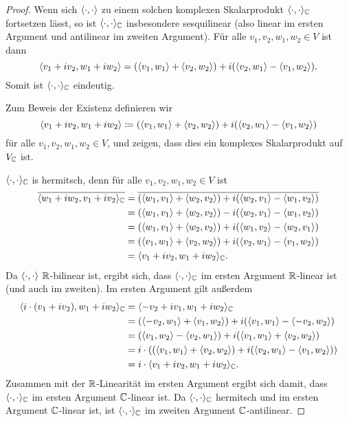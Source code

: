 \documentclass[a4paper,10pt]{article}
\begin{document}
\begin{proof}
  Wenn sich $\langle \cdot, \cdot \rangle$ zu einem solchen komplexen Skalarprodukt $\langle \cdot, \cdot \rangle_{\mathbb{C}}$ fortsetzen lässt, so ist $\langle \cdot, \cdot \rangle_{\mathbb{C}}$ insbesondere sesquilinear (also linear im ersten Argument und antilinear im zweiten Argument).
  Für alle $v_1, v_2, w_1, w_2 \in V$ ist dann
  \[
      \langle v_1 + i v_2, w_1 + i w_2 \rangle
    = ( \langle v_1, w_1 \rangle + \langle v_2, w_2 \rangle ) + i( \langle v_2, w_1 \rangle - \langle v_1, w_2 \rangle ).
  \]
  Somit ist $\langle \cdot, \cdot \rangle_{\mathbb{C}}$ eindeutig.
  
  Zum Beweis der Existenz definieren wir
  \[
              \langle v_1 + iv_2, w_1 + iw_2 \rangle
    \coloneqq ( \langle v_1, w_1 \rangle + \langle v_2, w_2 \rangle ) + i(\langle v_2, w_1 \rangle - \langle v_1, w_2 \rangle )
  \]
  für alle $v_1, v_2, w_1, w_2 \in V$, und zeigen, dass dies ein komplexes Skalarprodukt auf $V_{\mathbb{C}}$ ist.
  
  $\langle \cdot, \cdot \rangle_{\mathbb{C}}$ is hermitsch, denn für alle $v_1, v_2, w_1, w_2 \in V$ ist
  \begin{align*}
      \overline{ \langle w_1 + i w_2, v_1 + i v_2 \rangle_{\mathbb{C}} }
    &= \overline{ ( \langle w_1, v_1 \rangle + \langle w_2, v_2 \rangle ) + i( \langle w_2, v_1 \rangle - \langle w_1, v_2 \rangle ) } \\
    &= ( \langle w_1, v_1 \rangle + \langle w_2, v_2 \rangle ) - i( \langle w_2, v_1 \rangle - \langle w_1, v_2 \rangle ) \\
    &= ( \langle w_1, v_1 \rangle + \langle w_2, v_2 \rangle ) + i( \langle w_1, v_2 \rangle - \langle w_2, v_1 \rangle ) \\
    &= ( \langle v_1, w_1 \rangle + \langle v_2, w_2 \rangle ) + i( \langle v_2, w_1 \rangle - \langle v_1, w_2 \rangle ) \\
    &= \langle v_1 + i v_2, w_1 + i w_2 \rangle_{\mathbb{C}}.
  \end{align*}
  Da $\langle \cdot, \cdot \rangle$ $\mathbb{R}$-bilinear ist, ergibt sich, dass $\langle \cdot, \cdot \rangle_{\mathbb{C}}$ im ersten Argument $\mathbb{R}$-linear ist (und auch im zweiten).
  Im ersten Argument gilt außerdem
  \begin{align*}
      \langle i \cdot (v_1 + i v_2), w_1 + i w_2 \rangle_{\mathbb{C}}
    &= \langle - v_2 + i v_1, w_1 + i w_2 \rangle_{\mathbb{C}}  \\
    &= (\langle - v_2, w_1 \rangle + \langle v_1, w_2 \rangle) + i(\langle v_1, w_1 \rangle - \langle -v_2, w_2 \rangle) \\
    &= (\langle v_1, w_2 \rangle - \langle v_2, w_1 \rangle) + i(\langle v_1, w_1 \rangle + \langle v_2, w_2 \rangle) \\
    &= i \cdot ( (\langle v_1, w_1 \rangle + \langle v_2, w_2 \rangle) + i (\langle v_2, w_1 \rangle - \langle v_1, w_2 \rangle) )  \\
    &= i \cdot \langle v_1 + i v_2, w_1 + i w_2 \rangle_{\mathbb{C}}.
  \end{align*}
  Zusammen mit der $\mathbb{R}$-Linearität im ersten Argument ergibt sich damit, dass $\langle \cdot, \cdot \rangle_{\mathbb{C}}$ im ersten Argument $\mathbb{C}$-linear ist.
  Da $\langle \cdot, \cdot \rangle_{\mathbb{C}}$ hermitsch und im ersten Argument $\mathbb{C}$-linear ist, ist $\langle \cdot, \cdot \rangle_{\mathbb{C}}$ im zweiten Argument $\mathbb{C}$-antilinear.
  

\end{proof}
\end{document}
